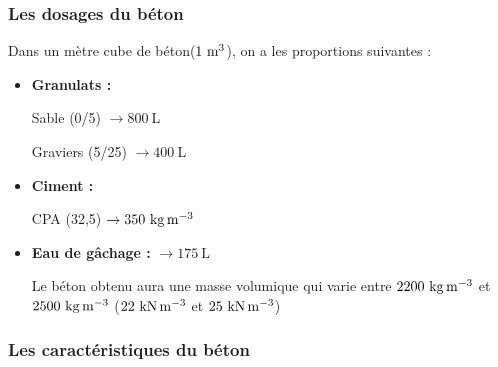 \documentclass[12pt,a4paper]{report}
\numberwithin{equation}{section}
\begin{document}
	\subsubsection{Les dosages du béton}
	
	Dans un mètre cube de béton($1\mcb$), on a les proportions suivantes :
	
	\begin{itemize}
		\item \textbf{Granulats :}
		
		\subitem Sable (0/5) $\rightarrow 800 ~\unit{\liter}$
		
		\subitem Graviers (5/25) $\rightarrow 400  ~\unit{\liter}$
		
		\item \textbf{Ciment : }
		
		\subitem CPA (32,5) $\rightarrow 350\kgmc$
		
		\item \textbf{Eau de gâchage : } $\rightarrow 175 ~\unit{\liter}$
		
		\begin{tcolorbox}[colback=gray!20, colframe=black, title=Remarque]
			Le béton obtenu aura une masse volumique qui varie entre $2200\kgmc$ et $2500\kgmc$ ($22\knmc$ et $25\knmc$)
		\end{tcolorbox}
		
	\end{itemize}
	
	
	\vspace{\baselineskip}
	
	\subsubsection{Les caractéristiques du béton}
		
		
		
\end{document}
